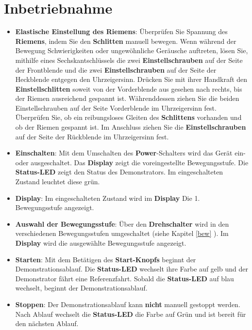 %
%

\chapter{Inbetriebnahme}

\begin{itemize} \label{STU}
	
	\item \textbf{Elastische Einstellung des Riemens}: Überprüfen Sie Spannung des \textbf{Riemens}, indem Sie den \textbf{Schlitten} manuell bewegen. Wenn während der Bewegung Schwierigkeiten oder ungewöhnliche Geräusche auftreten, lösen Sie, mithilfe eines Sechskantschlüssels die zwei \textbf{Einstellschrauben} auf der Seite der Frontblende und die zwei \textbf{Einstellschrauben} auf der Seite der Heckblende entgegen den Uhrzeigersinn. Drücken Sie mit ihrer Handkraft den \textbf{Einstellschlitten} soweit von der Vorderblende aus gesehen nach rechts, bis der Riemen ausreichend gespannt ist. Währenddessen ziehen Sie die beiden Einstellschrauben auf der Seite Vorderblende im Uhrzeigersinn fest. Überprüfen Sie, ob ein reibungsloses Gleiten des \textbf{Schlittens} vorhanden und ob der Riemen gespannt ist. Im Anschluss ziehen Sie die \textbf{Einstellschrauben} auf der Seite der Rückblende im Uhrzeigersinn fest. 
	
	\item \textbf{Einschalten}: Mit dem Umschalten des \textbf{Power}-Schalters wird das Gerät ein- oder ausgeschaltet. Das \textbf{Display} zeigt die voreingestellte Bewegungsstufe. Die \textbf{Status-LED} zeigt den Status des Demonstrators. Im eingeschalteten Zustand leuchtet diese grün.
	
	\item \textbf{Display}:  Im eingeschalteten Zustand wird im \textbf{Display} Die 1. Bewegungsstufe angezeigt. 
	
	\item \textbf{Auswahl der Bewegungsstufe}: Über den \textbf{Drehschalter} wird in den verschiedenen Bewegungsstufen umgeschaltet (siehe Kapitel \ref{bew} ). Im \textbf{Display} wird die ausgewählte Bewegungsstufe angezeigt.
	
	
	\item \textbf{Starten}: Mit dem Betätigen des \textbf{Start-Knopfs} beginnt der Demonstrationsablauf. Die \textbf{Status-LED} wechselt ihre Farbe auf gelb und der Demonstrator fährt eine Referenzfahrt. Sobald die \textbf{Status-LED} auf blau wechselt, beginnt der Demonstrationsablauf.
	
	\item \textbf{Stoppen}: Der Demonstrationsablauf kann \textbf{nicht} manuell gestoppt werden. Nach Ablauf wechselt die \textbf{Status-LED} die Farbe auf Grün und ist bereit für den nächsten Ablauf.
\end{itemize}